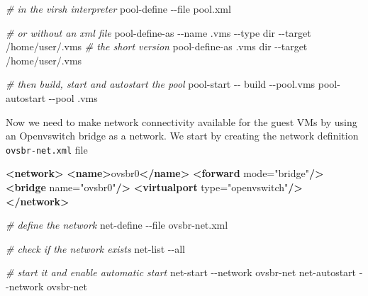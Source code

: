 \documentclass[
  14pt,
  english,
  a4paper,
]{scrreprt}
\newenvironment{Shaded}{}{}
\newcommand{\CommentTok}[1]{\textcolor[rgb]{0.38,0.63,0.69}{\textit{#1}}}
\newcommand{\ExtensionTok}[1]{#1}
\newcommand{\KeywordTok}[1]{\textcolor[rgb]{0.00,0.44,0.13}{\textbf{#1}}}
\newcommand{\NormalTok}[1]{#1}
\newcommand{\OtherTok}[1]{\textcolor[rgb]{0.00,0.44,0.13}{#1}}
\newcommand{\StringTok}[1]{\textcolor[rgb]{0.25,0.44,0.63}{#1}}
\begin{document}
\begin{Shaded}
\begin{Highlighting}[]
\CommentTok{\# in the virsh interpreter}
\ExtensionTok{pool{-}define}\NormalTok{ {-}{-}file pool.xml}

\CommentTok{\# or without an xml file}
\ExtensionTok{pool{-}define{-}as}\NormalTok{ {-}{-}name .vms {-}{-}type dir {-}{-}target /home/user/.vms}
\CommentTok{\# the short version}
\ExtensionTok{pool{-}define{-}as}\NormalTok{ .vms dir {-}{-}target /home/user/.vms}

\CommentTok{\# then build, start and autostart the pool}
\ExtensionTok{pool{-}start}\NormalTok{ {-}{-} build {-}{-}pool.vms}
\ExtensionTok{pool{-}autostart}\NormalTok{ {-}{-}pool .vms}
\end{Highlighting}
\end{Shaded}

Now we need to make network connectivity available for the guest VMs by
using an Openvswitch bridge as a network. We start by creating the
network definition \texttt{ovsbr-net.xml} file

\begin{Shaded}
\begin{Highlighting}[]
\KeywordTok{\textless{}network\textgreater{}}
    \KeywordTok{\textless{}name\textgreater{}}\NormalTok{ovsbr0}\KeywordTok{\textless{}/name\textgreater{}}
    \KeywordTok{\textless{}forward}\OtherTok{ mode=}\StringTok{"bridge"}\KeywordTok{/\textgreater{}}
    \KeywordTok{\textless{}bridge}\OtherTok{ name=}\StringTok{"ovsbr0"}\KeywordTok{/\textgreater{}}
    \KeywordTok{\textless{}virtualport}\OtherTok{ type=}\StringTok{"openvswitch"}\KeywordTok{/\textgreater{}}
\KeywordTok{\textless{}/network\textgreater{}}
\end{Highlighting}
\end{Shaded}

\begin{Shaded}
\begin{Highlighting}[]
\CommentTok{\# define the network}
\ExtensionTok{net{-}define}\NormalTok{ {-}{-}file ovsbr{-}net.xml}

\CommentTok{\# check if the network exists}
\ExtensionTok{net{-}list}\NormalTok{ {-}{-}all}

\CommentTok{\# start it and enable automatic start}
\ExtensionTok{net{-}start}\NormalTok{ {-}{-}network ovsbr{-}net}
\ExtensionTok{net{-}autostart}\NormalTok{ {-}{-}network ovsbr{-}net}
\end{Highlighting}
\end{Shaded}
\end{document}
